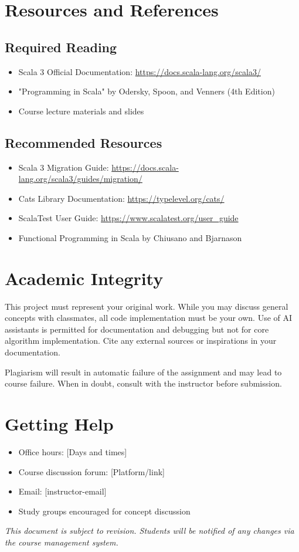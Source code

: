 \documentclass[11pt,a4paper]{article}
\begin{document}
\section{Resources and References}

\subsection{Required Reading}
\begin{itemize}
    \item Scala 3 Official Documentation: \url{https://docs.scala-lang.org/scala3/}
    \item "Programming in Scala" by Odersky, Spoon, and Venners (4th Edition)
    \item Course lecture materials and slides
\end{itemize}

\subsection{Recommended Resources}
\begin{itemize}
    \item Scala 3 Migration Guide: \url{https://docs.scala-lang.org/scala3/guides/migration/}
    \item Cats Library Documentation: \url{https://typelevel.org/cats/}
    \item ScalaTest User Guide: \url{https://www.scalatest.org/user_guide}
    \item Functional Programming in Scala by Chiusano and Bjarnason
\end{itemize}

\section{Academic Integrity}

This project must represent your original work. While you may discuss general concepts with classmates, all code implementation must be your own. Use of AI assistants is permitted for documentation and debugging but not for core algorithm implementation. Cite any external sources or inspirations in your documentation.

Plagiarism will result in automatic failure of the assignment and may lead to course failure. When in doubt, consult with the instructor before submission.

\section{Getting Help}

\begin{itemize}
    \item Office hours: [Days and times]
    \item Course discussion forum: [Platform/link]
    \item Email: [instructor-email]
    \item Study groups encouraged for concept discussion
\end{itemize}

\vfill
\textit{This document is subject to revision. Students will be notified of any changes via the course management system.}
\end{document}
